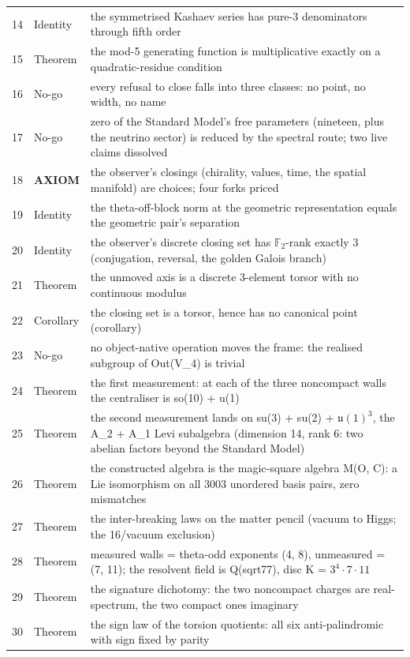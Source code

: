 \documentclass[11pt,a4paper]{article}
\theoremstyle{definition}
\theoremstyle{remark}
\begin{document}
\begin{longtable}{@{}r l p{8.2cm}@{}}
14 & Identity & the symmetrised Kashaev series has pure-3 denominators through fifth order \\
15 & Theorem & the mod-5 generating function is multiplicative exactly on a quadratic-residue condition \\
16 & No-go & every refusal to close falls into three classes: no point, no width, no name \\
17 & No-go & zero of the Standard Model's free parameters (nineteen, plus the neutrino sector) is reduced by the spectral route; two live claims dissolved \\
18 & \textbf{AXIOM} & the observer's closings (chirality, values, time, the spatial manifold) are choices; four forks priced \\
19 & Identity & the theta-off-block norm at the geometric representation equals the geometric pair's separation \\
20 & Identity & the observer's discrete closing set has $\mathbb{F}_2$-rank exactly 3 (conjugation, reversal, the golden Galois branch) \\
21 & Theorem & the unmoved axis is a discrete 3-element torsor with no continuous modulus \\
22 & Corollary & the closing set is a torsor, hence has no canonical point (corollary) \\
23 & No-go & no object-native operation moves the frame: the realised subgroup of Out(V\_4) is trivial \\
24 & Theorem & the first measurement: at each of the three noncompact walls the centraliser is so(10) + u(1) \\
25 & Theorem & the second measurement lands on su(3) + su(2) + $\mathfrak{u}(1)^3$, the A\_2 + A\_1 Levi subalgebra (dimension 14, rank 6: two abelian factors beyond the Standard Model) \\
26 & Theorem & the constructed algebra is the magic-square algebra M(O, C): a Lie isomorphism on all 3003 unordered basis pairs, zero mismatches \\
27 & Theorem & the inter-breaking laws on the matter pencil (vacuum to Higgs; the 16/vacuum exclusion) \\
28 & Theorem & measured walls = theta-odd exponents (4, 8), unmeasured = (7, 11); the resolvent field is Q(sqrt77), disc K = $3^4\cdot 7\cdot 11$ \\
29 & Theorem & the signature dichotomy: the two noncompact charges are real-spectrum, the two compact ones imaginary \\
30 & Theorem & the sign law of the torsion quotients: all six anti-palindromic with sign fixed by parity \\

\end{longtable}
\end{document}
